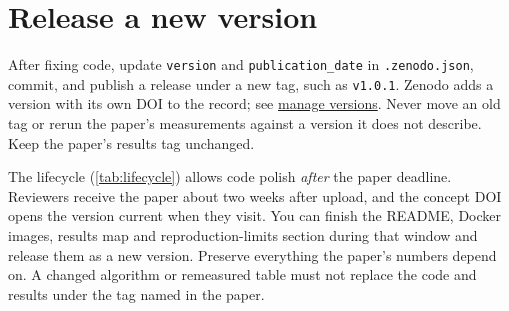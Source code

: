 \section{Release a new version}\label{app:zenodo:versions}
After fixing code, update \texttt{version} and \texttt{publication\_date} in \texttt{.zenodo.json}, commit, and publish a release under a new tag, such as \texttt{v1.0.1}. Zenodo adds a version with its own DOI to the record; see \href{https://help.zenodo.org/docs/deposit/manage-versions/}{manage versions}. Never move an old tag or rerun the paper's measurements against a version it does not describe. Keep the paper's results tag unchanged.

The lifecycle (\cref{tab:lifecycle}) allows code polish \emph{after} the paper deadline. Reviewers receive the paper about two weeks after upload, and the concept DOI opens the version current when they visit. You can finish the README, Docker images, results map and reproduction-limits section during that window and release them as a new version. Preserve everything the paper's numbers depend on. A changed algorithm or remeasured table must not replace the code and results under the tag named in the paper.
